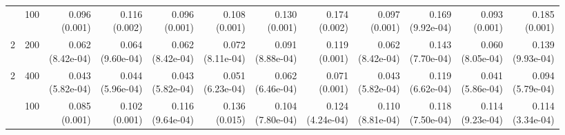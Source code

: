 \begin{table}[p]
{\begin{tabular}{llrrrrrrrrrr}
\addlinespace
2 & 100 & \shortstack{0.096\\(0.001)} & \shortstack{0.116\\(0.002)} & \shortstack{0.096\\(0.001)} & \shortstack{0.108\\(0.001)} & \shortstack{0.130\\(0.001)} & \shortstack{0.174\\(0.002)} & \shortstack{0.097\\(0.001)} & \shortstack{0.169\\(9.92e-04)} & \shortstack{0.093\\(0.001)} & \shortstack{0.185\\(0.001)} \\
2 & 200 & \shortstack{0.062\\(8.42e-04)} & \shortstack{0.064\\(9.60e-04)} & \shortstack{0.062\\(8.42e-04)} & \shortstack{0.072\\(8.11e-04)} & \shortstack{0.091\\(8.88e-04)} & \shortstack{0.119\\(0.001)} & \shortstack{0.062\\(8.42e-04)} & \shortstack{0.143\\(7.70e-04)} & \shortstack{0.060\\(8.05e-04)} & \shortstack{0.139\\(9.93e-04)} \\
2 & 400 & \shortstack{0.043\\(5.82e-04)} & \shortstack{0.044\\(5.96e-04)} & \shortstack{0.043\\(5.82e-04)} & \shortstack{0.051\\(6.23e-04)} & \shortstack{0.062\\(6.46e-04)} & \shortstack{0.071\\(0.001)} & \shortstack{0.043\\(5.82e-04)} & \shortstack{0.119\\(6.62e-04)} & \shortstack{0.041\\(5.86e-04)} & \shortstack{0.094\\(5.79e-04)} \\
\addlinespace
3 & 100 & \shortstack{0.085\\(0.001)} & \shortstack{0.102\\(0.001)} & \shortstack{0.116\\(9.64e-04)} & \shortstack{0.136\\(0.015)} & \shortstack{0.104\\(7.80e-04)} & \shortstack{0.124\\(4.24e-04)} & \shortstack{0.110\\(8.81e-04)} & \shortstack{0.118\\(7.50e-04)} & \shortstack{0.114\\(9.23e-04)} & \shortstack{0.114\\(3.34e-04)} \\

\end{tabular}}
\end{table}
